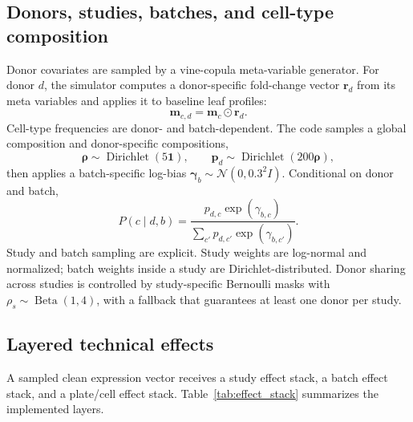 \documentclass{article}
\begin{document}
\subsection{Donors, studies, batches, and cell-type composition}

Donor covariates are sampled by a vine-copula meta-variable generator. For donor \(d\), the simulator computes a donor-specific fold-change vector \(\mathbf{r}_d\) from its meta variables and applies it to baseline leaf profiles:
\begin{equation}
    \mathbf{m}_{c,d}=\mathbf{m}_c\odot\mathbf{r}_d.
\end{equation}
Cell-type frequencies are donor- and batch-dependent. The code samples a global composition and donor-specific compositions,
\begin{equation}
    \boldsymbol{\rho}\sim\operatorname{Dirichlet}(5\mathbf{1}),
    \qquad
    \mathbf{p}_d\sim\operatorname{Dirichlet}(200\boldsymbol{\rho}),
\end{equation}
then applies a batch-specific log-bias \(\boldsymbol{\gamma}_b\sim\mathcal{N}(0,0.3^2I)\). Conditional on donor and batch,
\begin{equation}
    P(c\mid d,b)=\frac{p_{d,c}\exp(\gamma_{b,c})}{\sum_{c'}p_{d,c'}\exp(\gamma_{b,c'})}.
\end{equation}
Study and batch sampling are explicit. Study weights are log-normal and normalized; batch weights inside a study are Dirichlet-distributed. Donor sharing across studies is controlled by study-specific Bernoulli masks with \(\rho_s\sim\operatorname{Beta}(1,4)\), with a fallback that guarantees at least one donor per study.

\subsection{Layered technical effects}

A sampled clean expression vector receives a study effect stack, a batch effect stack, and a plate/cell effect stack. Table~\ref{tab:effect_stack} summarizes the implemented layers.
\end{document}
